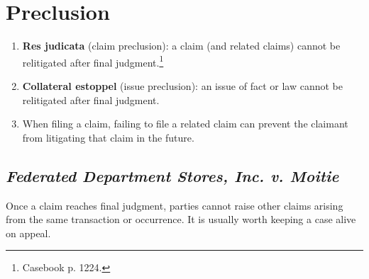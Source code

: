 \section{Preclusion}

\begin{enumerate}
    \item \textbf{Res judicata} (claim preclusion): a claim (and related 
    claims) cannot be relitigated after final judgment.\footnote{Casebook p. 
    1224.}
    \item \textbf{Collateral estoppel} (issue preclusion): an issue of fact or 
    law cannot be relitigated after final judgment.
    \item When filing a claim, failing to file a related claim can prevent 
    the claimant from litigating that claim in the future.
\end{enumerate}

\subsection{\emph{Federated Department Stores, Inc. v. Moitie}}

Once a claim reaches final judgment, parties cannot raise other claims arising 
from the same transaction or occurrence. It is usually worth keeping a case 
alive on appeal.

